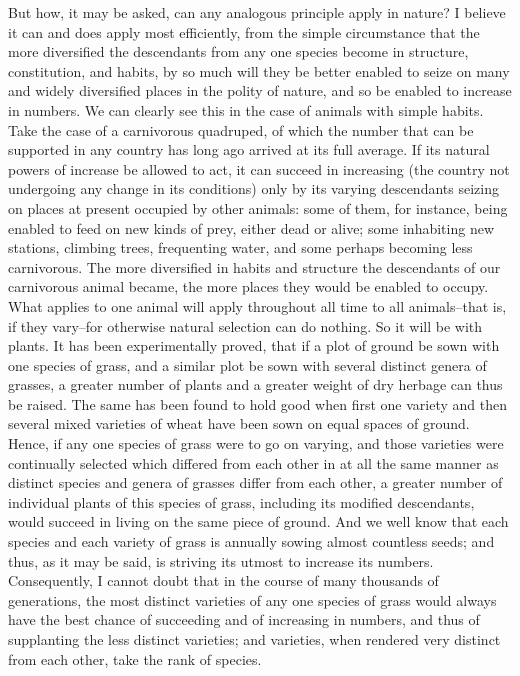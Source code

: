 But how, it may be asked, can any analogous principle apply in nature? I believe it can and does apply most efficiently, from the simple circumstance that the more diversified the descendants from any one species become in structure, constitution, and habits, by so much will they be better enabled to seize on many and widely diversified places in the polity of nature, and so be enabled to increase in numbers.
We can clearly see this in the case of animals with simple habits. Take the case of a carnivorous quadruped, of which the number that can be supported in any country has long ago arrived at its full average. If its natural powers of increase be allowed to act, it can succeed in increasing (the country not undergoing any change in its conditions) only by its varying descendants seizing on places at present occupied by other animals: some of them, for instance, being enabled to feed on new kinds of prey, either dead or alive; some inhabiting new stations, climbing trees, frequenting water, and some perhaps becoming less carnivorous. The more diversified in habits and structure the descendants of our carnivorous animal became, the more places they would be enabled to occupy. What applies to one animal will apply throughout all time to all animals--that is, if they vary--for otherwise natural selection can do nothing. So it will be with plants. It has been experimentally proved, that if a plot of ground be sown with one species of grass, and a similar plot be sown with several distinct genera of grasses, a greater number of plants and a greater weight of dry herbage can thus be raised. The same has been found to hold good when first one variety and then several mixed varieties of wheat have been sown on equal spaces of ground. Hence, if any one species of grass were to go on varying, and those varieties were continually selected which differed from each other in at all the same manner as distinct species and genera of grasses differ from each other, a greater number of individual plants of this species of grass, including its modified descendants, would succeed in living on the same piece of ground. And we well know that each species and each variety of grass is annually sowing almost countless seeds; and thus, as it may be said, is striving its utmost to increase its numbers. Consequently, I cannot doubt that in the course of many thousands of generations, the most distinct varieties of any one species of grass would always have the best chance of succeeding and of increasing in numbers, and thus of supplanting the less distinct varieties; and varieties, when rendered very distinct from each other, take the rank of species.
